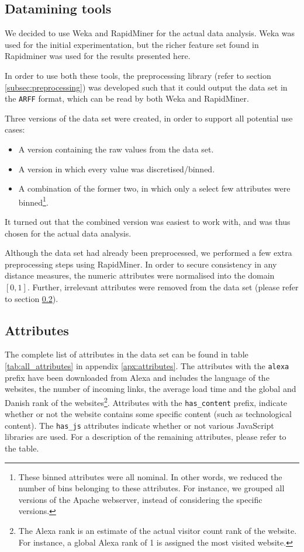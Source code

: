 \subsection{Datamining tools}
\label{subsec:weka}


We decided to use Weka and RapidMiner for the actual data analysis. Weka was used for the initial experimentation, but the richer feature set found in Rapidminer was used for the results presented here. 

In order to use both these tools, the preprocessing library (refer to section \ref{subsec:preprocessing}) was developed such that it could output the data set in the \texttt{ARFF} format, which can be read by both Weka and RapidMiner.

Three versions of the data set were created, in order to support all potential use cases:

\begin{itemize}
\item A version containing the raw values from the data set.
\item A version in which every value was discretised/binned.
\item A combination of the former two, in which only a select few attributes were binned\footnote{These binned attributes were all nominal. In other words, we reduced the number of bins belonging to these attributes. For instance, we grouped all versions of the Apache webserver, instead of considering the specific versions.}.
\end{itemize}

It turned out that the combined version was easiest to work with, and was thus chosen for the actual data analysis.

Although the data set had already been preprocessed, we performed a few extra preprocessing steps using RapidMiner. In order to secure consistency in any distance measures, the numeric attributes were normalised into the domain $[0, 1]$. Further, irrelevant attributes were removed from the data set (please refer to section \ref{subsec:attributes}).

\subsection{Attributes}
\label{subsec:attributes}

The complete list of attributes in the data set can be found in table \ref{tab:all_attributes} in appendix \ref{apx:attributes}. The attributes with the \texttt{alexa} prefix have been downloaded from Alexa and includes the language of the websites, the number of incoming links, the average load time and the global and Danish rank of the websites\footnote{The Alexa rank is an estimate of the actual visitor count rank of the website. For instance, a global Alexa rank of 1 is assigned the most visited website.}. Attributes with the \texttt{has\_content} prefix, indicate whether or not the website contains some specific content (such as technological content). The \texttt{has\_js} attributes indicate whether or not various JavaScript libraries are used. For a description of the remaining attributes, please refer to the table.

